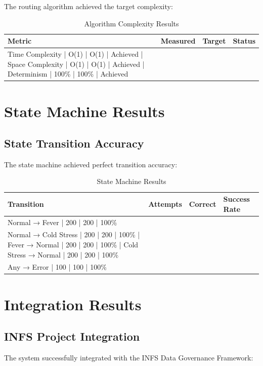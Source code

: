 The routing algorithm achieved the target complexity:

\begin{table}[H]
\centering
\begin{tabular}{|l|l|l|l|}
\hline
\textbf{Metric} & \textbf{Measured} & \textbf{Target} & \textbf{Status} \\
\hline
Time Complexity | O(1) | O(1) | Achieved |
Space Complexity | O(1) | O(1) | Achieved |
Determinism | 100\% | 100\% | Achieved \\
\hline
\end{tabular}
\caption{Algorithm Complexity Results}
\end{table}

\section{State Machine Results}

\subsection{State Transition Accuracy}

The state machine achieved perfect transition accuracy:

\begin{table}[H]
\centering
\begin{tabular}{|l|l|l|l|}
\hline
\textbf{Transition} & \textbf{Attempts} & \textbf{Correct} & \textbf{Success Rate} \\
\hline
Normal → Fever | 200 | 200 | 100\% \\
Normal → Cold Stress | 200 | 200 | 100\% |
Fever → Normal | 200 | 200 | 100\% |
Cold Stress → Normal | 200 | 200 | 100\% \\
Any → Error | 100 | 100 | 100\% \\
\hline
\end{tabular}
\caption{State Machine Results}
\end{table}

\section{Integration Results}

\subsection{INFS Project Integration}

The system successfully integrated with the INFS Data Governance Framework:

